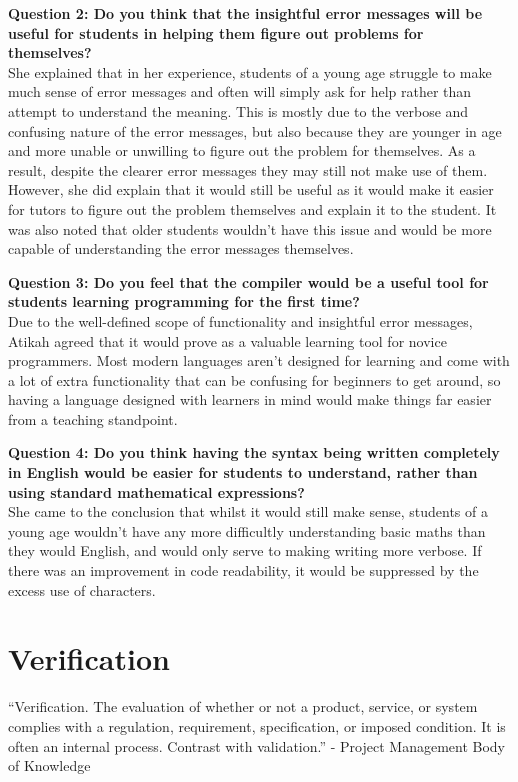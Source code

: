 \documentclass[
]{report}
\begin{document}
\textbf{Question 2: Do you think that the insightful error messages will
be useful for students in helping them figure out problems for
themselves?}\\
She explained that in her experience, students of a young age struggle
to make much sense of error messages and often will simply ask for help
rather than attempt to understand the meaning. This is mostly due to the
verbose and confusing nature of the error messages, but also because
they are younger in age and more unable or unwilling to figure out the
problem for themselves. As a result, despite the clearer error messages
they may still not make use of them. However, she did explain that it
would still be useful as it would make it easier for tutors to figure
out the problem themselves and explain it to the student. It was also
noted that older students wouldn't have this issue and would be more
capable of understanding the error messages themselves.

\textbf{Question 3: Do you feel that the compiler would be a useful tool
for students learning programming for the first time?}\\
Due to the well-defined scope of functionality and insightful error
messages, Atikah agreed that it would prove as a valuable learning tool
for novice programmers. Most modern languages aren't designed for
learning and come with a lot of extra functionality that can be
confusing for beginners to get around, so having a language designed
with learners in mind would make things far easier from a teaching
standpoint.

\textbf{Question 4: Do you think having the syntax being written
completely in English would be easier for students to understand, rather
than using standard mathematical \glspl{expression}?}\\
She came to the conclusion that whilst it would still make sense,
students of a young age wouldn't have any more difficultly understanding
basic maths than they would English, and would only serve to making
writing more verbose. If there was an improvement in code readability,
it would be suppressed by the excess use of characters.

\section{Verification}
``Verification. The evaluation of whether or not a product, service, or
system complies with a regulation, requirement, specification, or
imposed condition. It is often an internal process. Contrast with
validation.'' - Project Management Body of Knowledge \cite{pmbok-book}
\end{document}

